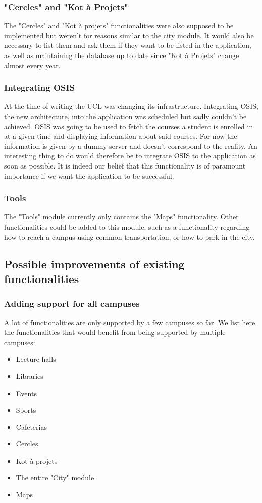 \documentclass{eplmastersthesis}
\begin{document}
\subsubsection{"Cercles" and "Kot à Projets"}
The "Cercles" and "Kot à projets" functionalities were also supposed to be implemented but weren't for reasons similar to the city module. It would also be necessary to list them and ask them if they want to be listed in the application, as well as maintaining the database up to date since "Kot à Projets" change almost every year.
\subsubsection{Integrating OSIS}
At the time  of writing the UCL was changing its infrastructure. Integrating OSIS, the new architecture, into the application was scheduled but sadly couldn't be achieved. OSIS was going to be used to fetch the courses a student is enrolled in at a given time and displaying information about said courses. 
For now the information is given by a dummy server and doesn't correspond to the reality. An interesting thing to do would therefore be to integrate OSIS to the application as soon as possible.  It is indeed our belief that this functionality is of paramount importance if we want the application to be successful. 
\subsubsection{Tools}
The "Tools" module currently only contains the "Maps" functionality. Other functionalities could be added to this module, such as a functionality regarding how to reach a campus using common transportation, or how to park in the city.
\subsection{Possible improvements of existing functionalities}
\subsubsection{Adding support for all campuses}
A lot of functionalities are only supported by a few campuses so far. We list here the functionalities that would benefit from being supported by multiple campuses:
\begin{itemize}
\item Lecture halls
\item Libraries
\item Events
\item Sports
\item Cafeterias
\item Cercles
\item Kot à projets
\item The entire "City" module
\item Maps
\end{itemize}
\end{document}
